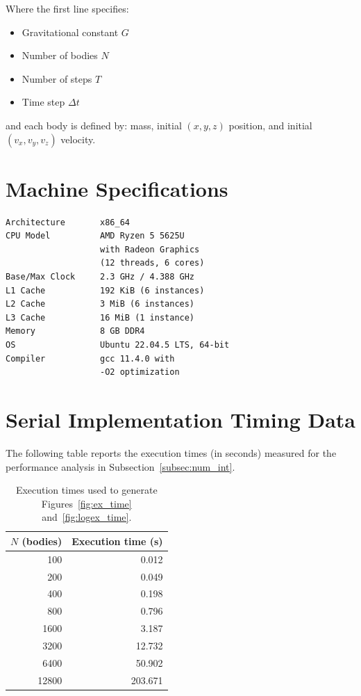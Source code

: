 \documentclass{article}
\begin{document}
Where the first line specifies:
\begin{itemize}
    \item Gravitational constant $G$
    \item Number of bodies $N$
    \item Number of steps $T$
    \item Time step $\Delta t$
\end{itemize}
and each body is defined by: mass, initial $(x, y, z)$ position, and initial $(v_x, v_y, v_z)$ velocity.

\section[Machine Specifications]{Machine Specifications}
\label{appendix:machine_specs}

\begin{verbatim}
Architecture       x86_64
CPU Model          AMD Ryzen 5 5625U
                   with Radeon Graphics 
                   (12 threads, 6 cores)
Base/Max Clock     2.3 GHz / 4.388 GHz
L1 Cache           192 KiB (6 instances)
L2 Cache           3 MiB (6 instances)
L3 Cache           16 MiB (1 instance)
Memory             8 GB DDR4
OS                 Ubuntu 22.04.5 LTS, 64-bit
Compiler           gcc 11.4.0 with
                   -O2 optimization
\end{verbatim}


\section{Serial Implementation Timing Data}
\label{appendix:serial_times}
The following table reports the execution times (in seconds) measured for the performance analysis in Subsection~\ref{subsec:num_int}.

\begin{table}[H]
    \centering
    \begin{tabular}{r r}
        \toprule
        \textbf{$N$ (bodies)} & \textbf{Execution time (s)} \\
        \midrule
        100 & 0.012 \\
        200 & 0.049 \\
        400 & 0.198 \\
        800 & 0.796 \\
        1600 & 3.187 \\
        3200 & 12.732 \\
        6400 & 50.902 \\
        12800 & 203.671 \\
        \bottomrule
    \end{tabular}
    \caption{Execution times used to generate Figures~\ref{fig:ex_time} and~\ref{fig:logex_time}.}
    \label{tab:serial_times}
\end{table}
\end{document}
